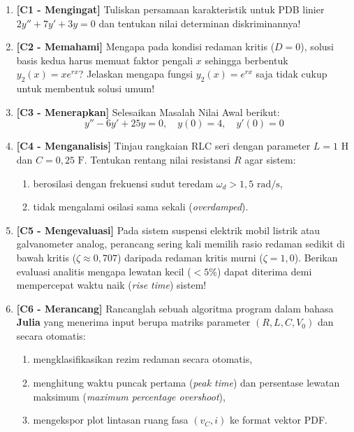 \documentclass[11pt,a4paper]{article}
\theoremstyle{definition}
\begin{document}
\begin{enumerate}[leftmargin=*]
    \item \textbf{[C1 - Mengingat]} Tuliskan persamaan karakteristik untuk PDB linier $2 y'' + 7 y' + 3 y = 0$ dan tentukan nilai determinan diskriminannya!
    
    \item \textbf{[C2 - Memahami]} Mengapa pada kondisi redaman kritis ($D = 0$), solusi basis kedua harus memuat faktor pengali $x$ sehingga berbentuk $y_2(x) = x e^{rx}$? Jelaskan mengapa fungsi $y_2(x) = e^{rx}$ saja tidak cukup untuk membentuk solusi umum!
    
    \item \textbf{[C3 - Menerapkan]} Selesaikan Masalah Nilai Awal berikut:
    \begin{equation*}
        y'' - 6y' + 25y = 0, \quad y(0) = 4, \quad y'(0) = 0
    \end{equation*}
    
    \item \textbf{[C4 - Menganalisis]} Tinjau rangkaian RLC seri dengan parameter $L = 1\text{ H}$ dan $C = 0{,}25\text{ F}$. Tentukan rentang nilai resistansi $R$ agar sistem:
    \begin{enumerate}[label=(\roman*)]
        \item berosilasi dengan frekuensi sudut teredam $\omega_d > 1{,}5\text{ rad/s}$,
        \item tidak mengalami osilasi sama sekali (\textit{overdamped}).
    \end{enumerate}
    
    \item \textbf{[C5 - Mengevaluasi]} Pada sistem suspensi elektrik mobil listrik atau galvanometer analog, perancang sering kali memilih rasio redaman sedikit di bawah kritis ($\zeta \approx 0{,}707$) daripada redaman kritis murni ($\zeta = 1{,}0$). Berikan evaluasi analitis mengapa lewatan kecil ($<5\%$) dapat diterima demi mempercepat waktu naik (\textit{rise time}) sistem!
    
    \item \textbf{[C6 - Merancang]} Rancanglah sebuah algoritma program dalam bahasa \textbf{Julia} yang menerima input berupa matriks parameter $(R, L, C, V_0)$ dan secara otomatis:
    \begin{enumerate}[label=(\roman*)]
        \item mengklasifikasikan rezim redaman secara otomatis,
        \item menghitung waktu puncak pertama (\textit{peak time}) dan persentase lewatan maksimum (\textit{maximum percentage overshoot}),
        \item mengekspor plot lintasan ruang fasa $(v_C, i)$ ke format vektor PDF.
    \end{enumerate}
\end{enumerate}
\end{document}
